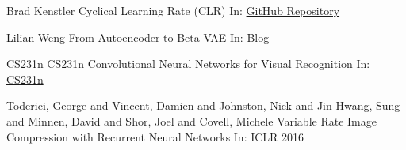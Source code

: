 \documentclass{beamer}
\begin{document}
\begin{frame}[allowframebreaks]
{\begin{thebibliography}{99}
 Brad Kenstler
\newblock Cyclical Learning Rate (CLR)
\newblock In: \href{https://github.com/bckenstler/CLR/}{GitHub Repository}

 Lilian Weng
\newblock From Autoencoder to Beta-VAE
\newblock In: \href{https://lilianweng.github.io/lil-log/2018/08/12/from-autoencoder-to-beta-vae.html}{Blog}

 CS231n
\newblock CS231n Convolutional Neural Networks for Visual Recognition
\newblock In: \href{http://cs231n.github.io/convolutional-networks}{CS231n}

 Toderici, George and Vincent, Damien and Johnston, Nick and Jin Hwang, Sung and Minnen, David and Shor, Joel and Covell, Michele
\newblock Variable Rate Image Compression with Recurrent Neural Networks
\newblock In: ICLR 2016


\end{thebibliography}
}
\end{frame}
\end{document}
